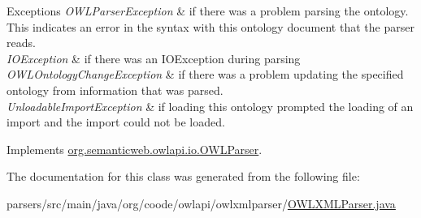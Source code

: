 \begin{DoxyExceptions}{Exceptions}
{\em O\-W\-L\-Parser\-Exception} & if there was a problem parsing the ontology. This indicates an error in the syntax with this ontology document that the parser reads. \\
\hline
{\em I\-O\-Exception} & if there was an I\-O\-Exception during parsing \\
\hline
{\em O\-W\-L\-Ontology\-Change\-Exception} & if there was a problem updating the specified ontology from information that was parsed. \\
\hline
{\em Unloadable\-Import\-Exception} & if loading this ontology prompted the loading of an import and the import could not be loaded. \\
\hline
\end{DoxyExceptions}


Implements \hyperlink{interfaceorg_1_1semanticweb_1_1owlapi_1_1io_1_1_o_w_l_parser_a259739c6baf94f4e5a2dad5d0400f07a}{org.\-semanticweb.\-owlapi.\-io.\-O\-W\-L\-Parser}.



The documentation for this class was generated from the following file\-:\begin{DoxyCompactItemize}
\item 
parsers/src/main/java/org/coode/owlapi/owlxmlparser/\hyperlink{_o_w_l_x_m_l_parser_8java}{O\-W\-L\-X\-M\-L\-Parser.\-java}\end{DoxyCompactItemize}
